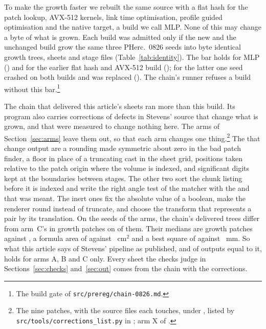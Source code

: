 To make the growth faster we rebuilt the same source with a flat hash for the patch lookup, AVX-512 kernels, link time
optimisation, profile guided optimisation and the native target, a build we call MLP. None of this may change a byte of
what is grown. Each build was admitted only if the new and the unchanged build grow the same three PHerc.~0826 seeds into
byte identical growth trees, sheets and stage files (Table~\ref{tab:identity}). The bar holds for MLP (\IdMlpHolds{})
and for the earlier flat hash and AVX-512 build (\IdHvHolds{}); for the latter one seed crashed on both builds and was
replaced (\IdHvReplaced{}). The chain's runner refuses a build without this bar.\footnote{The build gate of
\texttt{src/prereg/chain-0826.md}.}

The chain that delivered this article's sheets ran more than this build. Its program also carries \CorrOutput{}
corrections of defects in Stevens' source that change what is grown, and \CorrInert{} that were measured to change
nothing here. The arms of Section~\ref{sec:arms} leave them out, so that each arm changes one thing.\footnote{The nine
patches, with the source files each touches, under , listed by
\texttt{src/tools/corrections\_list.py} in ; arm X of
.} The \CorrOutput{} that change output are a rounding made symmetric about
zero in the bad patch finder, a floor in place of a truncating cast in the sheet grid, positions taken relative to the
patch origin where the volume is indexed, and significant digits kept at the boundaries between stages. The other two
sort the chunk listing before it is indexed and write the right angle test of the matcher with the and that was meant.
The \CorrInert{} inert ones fix the absolute value of a boolean, make the renderer round instead of truncate, and choose
the transform that represents a pair by its translation. On the \CorrSeeds{} seeds of the arms, the chain's delivered
trees differ from arm~C's in growth patches on \CorrSeedsDiffer{} of them. Their medians are \CorrPatchesX{} growth patches
against \CorrPatchesC{}, a formula area of \CorrFormulaX{} against \CorrFormulaC{}~cm$^2$ and a best square of
\CorrSquareX{} against \CorrSquareC{}~mm. So what this article says of Stevens' pipeline as published, and of outputs
equal to it, holds for arms A, B and C only. Every sheet the checks judge in Sections~\ref{sec:checks} and~\ref{sec:out} comes from the chain with the
corrections.

